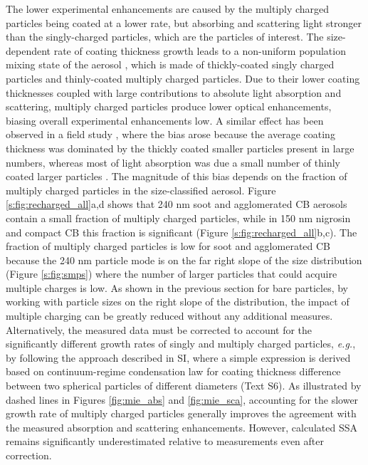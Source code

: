 The lower experimental enhancements are caused by the multiply charged particles being coated at a lower rate, but absorbing and scattering light stronger than the singly-charged particles, which are the particles of interest. The size-dependent rate of coating thickness growth leads to a non-uniform population mixing state of the aerosol \citep{RN75}, which is made of thickly-coated singly charged particles and thinly-coated multiply charged particles. Due to their lower coating thicknesses coupled with large contributions to absolute light absorption and scattering, multiply charged particles produce lower optical enhancements, biasing overall experimental enhancements low. A similar effect has been observed in a field study \citep{RN76}, where the bias arose because the average coating thickness was dominated by the thickly coated smaller particles present in large numbers, whereas most of light absorption was due a small number of thinly coated larger particles \citep{RN52,RN75}. The magnitude of this bias depends on the fraction of multiply charged particles in the size-classified aerosol. Figure \ref{s:fig:recharged_all}a,d shows that 240 nm soot and agglomerated CB aerosols contain a small fraction of multiply charged particles, while in 150 nm nigrosin and compact CB this fraction is significant (Figure \ref{s:fig:recharged_all}b,c). The fraction of multiply charged particles is low for soot and agglomerated CB because the 240 nm particle mode is on the far right slope of the size distribution (Figure \ref{s:fig:smps}) where the number of larger particles that could acquire multiple charges is low. As shown in the previous section for bare particles, by working with particle sizes on the right slope of the distribution, the impact of multiple charging can be greatly reduced without any additional measures. Alternatively, the measured data must be corrected to account for the significantly different growth rates of singly and multiply charged particles, \textit{e.g.}, by following the approach described in SI, where a simple expression is derived based on continuum-regime condensation law for coating thickness difference between two spherical particles of different diameters (Text S6). As illustrated by dashed lines in Figures \ref{fig:mie_abs} and \ref{fig:mie_sca}, accounting for the slower growth rate of multiply charged particles generally improves the agreement with the measured absorption and scattering enhancements. However, calculated SSA remains significantly underestimated relative to measurements even after correction.

